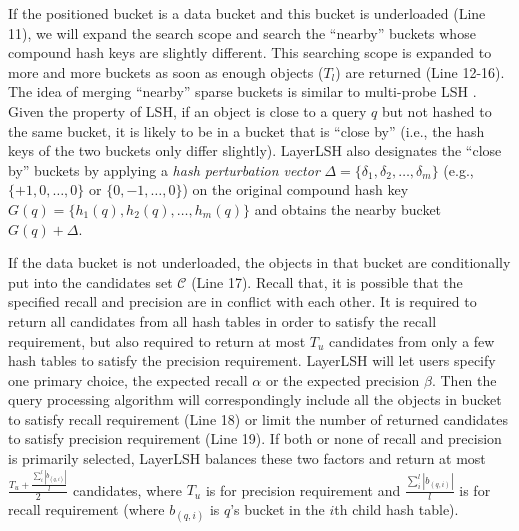 If the positioned bucket is a data bucket and this bucket is underloaded (Line 11), we will expand the search scope and search the ``nearby'' buckets whose compound hash keys are slightly different. This searching scope is expanded to more and more buckets as soon as enough objects ($T_l$) are returned (Line 12-16). The idea of merging ``nearby'' sparse buckets is similar to multi-probe LSH \cite{mplsh}. Given the property of LSH, if an object is close to a query $q$ but not hashed to the same bucket, it is likely to be in a bucket that is ``close by'' (i.e., the hash keys of the two buckets only differ slightly). LayerLSH also designates the ``close by'' buckets by applying a \emph{hash perturbation vector} $\Delta=\{\delta_1,\delta_2,\ldots,\delta_m\}$ (e.g., $\{+1,0,\ldots,0\}$ or $\{0,-1,\ldots,0\}$) on the original compound hash key $G(q)=\{h_1(q),h_2(q),\ldots,h_m(q)\}$ and obtains the nearby bucket $G(q)+\Delta$.



If the data bucket is not underloaded, the objects in that bucket are conditionally put into the candidates set $\mathcal{C}$ (Line 17). Recall that, it is possible that the specified recall and precision are in conflict with each other. It is required to return all candidates from all hash tables in order to satisfy the recall requirement, but also required to return at most $T_u$ candidates from only a few hash tables to satisfy the precision requirement. LayerLSH will let users specify one primary choice, the expected recall $\alpha$ or the expected precision $\beta$. Then the query processing algorithm will correspondingly include all the objects in bucket to satisfy recall requirement (Line 18) or limit the number of returned candidates to satisfy precision requirement (Line 19). If both or none of recall and precision is primarily selected, LayerLSH balances these two factors and return at most $\frac{T_u+\frac{\sum_{i}^{l}|b_{(q,i)}|}{l}}{2}$ candidates, where $T_u$ is for precision requirement and $\frac{\sum_{i}^{l}|b_{(q,i)}|}{l}$ is for recall requirement (where $b_{(q,i)}$ is $q$'s bucket in the $i$th child hash table).




